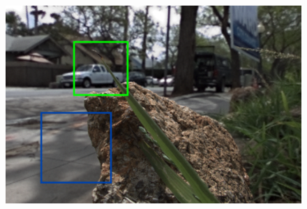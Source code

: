 \documentclass[10pt,twocolumn,letterpaper]{article}
\begin{document}
\begin{figure}[h]
\begin{multicols}{3}
    \end{multicols}
    \begin{multicols}{2}
        \includegraphics[width=\linewidth]{truth_05_05_map.png}
        \begin{multicols}{3}

\end{multicols}
\end{multicols}
\end{figure}
\end{document}

